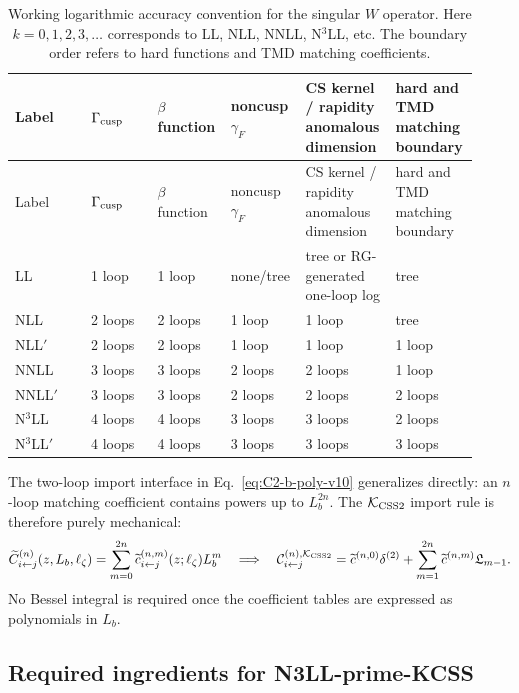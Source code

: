 \documentclass[11pt]{article}
\newcommand{\deltaT}{\delta^{(2)}}
\newcommand{\KCSS}{\mathcal K_{\rm CSS2}}
\begin{document}
\begin{longtable}{p{0.16\linewidth} p{0.14\linewidth} p{0.14\linewidth} p{0.14\linewidth} p{0.17\linewidth} p{0.17\linewidth}}
\caption{Working logarithmic accuracy convention for the singular $W$ operator.  Here
$k=0,1,2,3,\ldots$ corresponds to LL, NLL, NNLL, N$^3$LL, etc.  The boundary order refers
to hard functions and TMD matching coefficients.}\label{tab:generic-accuracy-v13}\\
\toprule
Label & $\Gamma_{\rm cusp}$ & $\beta$ function & noncusp $\gamma_F$ & CS kernel / rapidity anomalous dimension & hard and TMD matching boundary \\
\midrule
\endfirsthead
\toprule
Label & $\Gamma_{\rm cusp}$ & $\beta$ function & noncusp $\gamma_F$ & CS kernel / rapidity anomalous dimension & hard and TMD matching boundary \\
\midrule
\endhead
LL & 1 loop & 1 loop & none/tree & tree or RG-generated one-loop log & tree \\
NLL & 2 loops & 2 loops & 1 loop & 1 loop & tree \\
NLL$'$ & 2 loops & 2 loops & 1 loop & 1 loop & 1 loop \\
NNLL & 3 loops & 3 loops & 2 loops & 2 loops & 1 loop \\
NNLL$'$ & 3 loops & 3 loops & 2 loops & 2 loops & 2 loops \\
N$^3$LL & 4 loops & 4 loops & 3 loops & 3 loops & 2 loops \\
N$^3$LL$'$ & 4 loops & 4 loops & 3 loops & 3 loops & 3 loops \\
\bottomrule
\end{longtable}

The two-loop import interface in Eq.~\eqref{eq:C2-b-poly-v10} generalizes directly: an $n$-loop matching coefficient contains powers up
to $L_b^{2n}$.  The $\KCSS$ import rule is therefore purely mechanical:
\begin{equation}
  \widetilde C_{i\leftarrow j}^{(n)}(z,L_b,\ell_\zeta)
  =\sum_{m=0}^{2n}\widetilde c_{i\leftarrow j}^{(n,m)}(z;\ell_\zeta)L_b^m
  \quad\Longrightarrow\quad
  \mathcal C_{i\leftarrow j}^{(n),\KCSS}
  =\widetilde c^{(n,0)}\deltaT+
  \sum_{m=1}^{2n}\widetilde c^{(n,m)}\mathfrak L_{m-1}.
  \label{eq:N3LO-import-map-v13}
\end{equation}
No Bessel integral is required once the coefficient tables are expressed as polynomials in
$L_b$.

\subsection{Required ingredients for N3LL-prime-KCSS}
\end{document}
